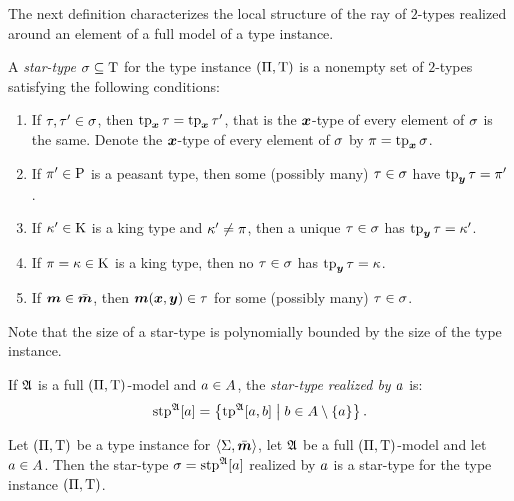 The next definition characterizes the local structure of the ray of $2$-types
realized around an element of a full model of a type instance.
\begin{definition}
A \emph{star-type} $\sigma \subseteq \mathrm{T}$ for the type instance
$(\Pi,\mathrm{T})$ is a nonempty set of $2$-types satisfying the following conditions:
\begin{enumerate}
  \item\label{cond:star-1} If $\tau, {\tau'} \in \sigma$, then $\operatorname{tp}_{\bm{x}}\tau =
  \operatorname{tp}_{\bm{x}}{\tau'}$, that is the $\bm{x}$-type of every element of $\sigma$ is the same.
  Denote the $\bm{x}$-type of every element of $\sigma$ by $\pi = \operatorname{tp}_{\bm{x}}\sigma$.
  \item\label{cond:star-2} If ${\pi'} \in \mathrm{P}$ is a peasant type, then some
  (possibly many) $\tau \in \sigma$ have $\operatorname{tp}_{\bm{y}}\tau = {\pi'}$.
  \item\label{cond:star-3} If ${\kappa'} \in \mathrm{K}$ is a king type and 
  ${\kappa'} \neq \pi$, then a unique $\tau \in \sigma$ has $\operatorname{tp}_{\bm{y}}\tau = {\kappa'}$.
  \item\label{cond:star-4} If $\pi = \kappa \in \mathrm{K}$ is a king type, then no
  $\tau\in\sigma$ has $\operatorname{tp}_{\bm{y}}\tau = \kappa$.
  \item\label{cond:star-5} If $\bm{m} \in \bar{\bm{m}}$, then $\bm{m}(\bm{x},\bm{y}) \in \tau$ for
  some (possibly many) $\tau \in \sigma$.
\end{enumerate}
Note that the size of a star-type is polynomially bounded by the size of the
type instance.

If $\mathfrak{A}$ is a full $(\Pi,\mathrm{T})$-model and $a \in A$, the
\emph{star-type realized by $a$} is:
\[
  \operatorname{stp}^{\mathfrak{A}}[a] = \left\{\operatorname{tp}^{\mathfrak{A}}[a,b]\mathrel{}\middle|\mathrel{}b \in A \setminus \left\{a\right\}\right\}.
\]
\end{definition}
\begin{remark}
Let $(\Pi,\mathrm{T})$ be a type instance for $\left\langle \mathrm{\Sigma},\bar{\bm{m}} \right\rangle$, let $\mathfrak{A}$ be
a full $(\Pi,\mathrm{T})$-model and let $a \in A$. Then the star-type
$\sigma = \operatorname{stp}^{\mathfrak{A}}[a]$ realized by $a$ is a star-type for the type instance
$(\Pi,\mathrm{T})$.
\end{remark}
